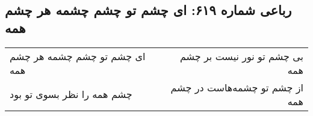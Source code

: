 \begin{center}
\section*{رباعی شماره ۶۱۹: ای چشم تو چشم چشمه هر چشم همه}
\label{sec:sh619}
\begin{longtable}{l p{0.5cm} r}
ای چشم تو چشم چشمه هر چشم همه
&&
بی چشم تو نور نیست بر چشم همه
\\
چشم همه را نظر بسوی تو بود
&&
از چشم تو چشمه‌هاست در چشم همه
\\
\end{longtable}
\end{center}
